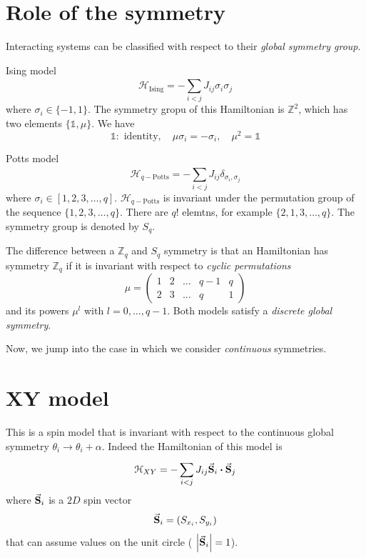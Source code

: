 \documentclass[../main/main.tex]{subfiles}
\begin{document}
\section{Role of the symmetry}
Interacting systems can be classified with respect to their \emph{global symmetry group}.
\begin{example}{Ising model}{}
  \begin{equation}
    \mathcal{H}_{\text{Ising}} = - \sum_{i<j}^{} J_{ij} \sigma _i \sigma _j
  \end{equation}
  where \( \sigma _i \in \{ -1,1 \}   \). The symmetry gropu of this Hamiltonian is \( \mathbb{Z}^2 \), which has two elements \( \{ \mathbb{1}, \mu  \}   \). We have
  \begin{equation}
    \mathbb{1}: \text{ identity}, \quad \mu \sigma _i = - \sigma _i, \quad \mu ^2 = \mathbb{1}
  \end{equation}
\end{example}
\begin{example}{Potts model}{}
  \begin{equation}
    \mathcal{H}_{q- \text{Potts}} = - \sum_{i<j}^{} J_{ij} \delta _{\sigma _i, \sigma _j}
  \end{equation}
  where \( \sigma _i \in [1,2,3,\dots,q] \). \( \mathcal{H}_{q- \text{Potts}} \)  is invariant under the permutation group of the sequence \( \{ 1,2,3,\dots,q \}   \). There are \( q! \) elemtns, for example \( \{ 2,1,3,\dots,q \}   \). The symmetry group is denoted by \( S_q \).
\end{example}
\begin{remark}
The difference between a \( \mathbb{Z}_q \) and \( S_q \) symmetry is that an Hamiltonian has symmetry \( \mathbb{Z}_q \) if it is invariant with respect to \emph{cyclic permutations}
\begin{equation}
  \mu = \begin{pmatrix}
    1 & 2 & \dots & q-1 & q \\
    2 & 3 & \dots & q & 1
  \end{pmatrix}
\end{equation}
and its powers \( \mu ^l \) with \( l=0, \dots, q-1 \). Both models satisfy a \emph{discrete global symmetry}.
\end{remark}
Now, we jump into the case in which we consider \emph{continuous} symmetries.

\section{XY model}
This is a spin model that is invariant with respect to the continuous global symmetry
\( \theta _i \rightarrow \theta _i + \alpha  \).
Indeed the Hamiltonian of this model is
\begin{equation}
  \mathcal{H}_{XY} = - \sum_{i<j}^{} J_{ij} \va{S}_i \vdot \va{S}_j
\end{equation}
where \(\va{S}_i  \) is a \( 2D \) spin vector
\begin{equation}
  \va{S}_i = (S_{x_i}, S_{y_i})
\end{equation}
that can assume values on the unit circle ( \(  \abs{\va{S}_i} =1 \)).
\end{document}
